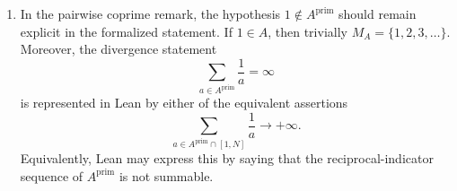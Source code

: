 \documentclass[11pt]{article}
\theoremstyle{definition}
\theoremstyle{remark}
\newcommand{\PP}{A^{\mathrm{prim}}}
\begin{document}
\begin{enumerate}
\item In the pairwise coprime remark, the hypothesis \(1\notin \PP\) should remain explicit in the formalized statement.
If \(1\in A\), then trivially \(M_A=\{1,2,3,\dots\}\).
Moreover, the divergence statement
\[
\sum_{a\in \PP}\frac1a=\infty
\]
is represented in Lean by either of the equivalent assertions
\[
\sum_{a\in \PP\cap[1,N]}\frac1a \to +\infty.
\]
Equivalently, Lean may express this by saying that the reciprocal-indicator sequence of \(\PP\) is not summable.
\end{enumerate}
\end{document}
